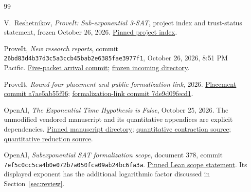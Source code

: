 \clearpage
{}
{}

\begin{thebibliography}{99}

V.~Reshetnikov, \emph{ProveIt: Sub-exponential 3-SAT}, project index and trust-status statement, frozen October 26, 2026. \href{https://github.com/VladimirReshetnikov/ProveIt/blob/8e76d515063c4b9fbd8743a846b457e3a01bc039/Computability/SubexponentialSAT/README.md}{Pinned project index}.

ProveIt, \emph{New research reports}, commit \texttt{26bd83d4b37d3c5a3ccb45bab2e6385fae3977f1}, October 26, 2026, 8:51 PM Pacific. \href{https://github.com/VladimirReshetnikov/ProveIt/commit/26bd83d4b37d3c5a3ccb45bab2e6385fae3977f1}{Five-packet arrival commit}; \href{https://github.com/VladimirReshetnikov/ProveIt/tree/8e76d515063c4b9fbd8743a846b457e3a01bc039/docs/incoming}{frozen incoming directory}.

ProveIt, \emph{Round-four placement and public formalization link}, 2026. \href{https://github.com/VladimirReshetnikov/ProveIt/commit/a7ae5ab55f9627f5af7bf77443b3c34ef8ef1be4}{Placement commit a7ae5ab55f96}; \href{https://github.com/VladimirReshetnikov/ProveIt/commit/7de9d09fecd17de776d712835ecb2011205c531d}{formalization-link commit 7de9d09fecd1}.

OpenAI, \emph{The Exponential Time Hypothesis is False}, October 25, 2026. The unmodified vendored manuscript and its quantitative appendices are explicit dependencies. \href{https://github.com/VladimirReshetnikov/ProveIt/tree/8e76d515063c4b9fbd8743a846b457e3a01bc039/lib/openai-math/preprints/The-Exponential-Time-Hypothesis-is-False-October-25-2026}{Pinned manuscript directory}; \href{https://github.com/VladimirReshetnikov/ProveIt/blob/8e76d515063c4b9fbd8743a846b457e3a01bc039/lib/openai-math/preprints/The-Exponential-Time-Hypothesis-is-False-October-25-2026/build/quantitative-contraction.tex}{quantitative contraction source}; \href{https://github.com/VladimirReshetnikov/ProveIt/blob/8e76d515063c4b9fbd8743a846b457e3a01bc039/lib/openai-math/preprints/The-Exponential-Time-Hypothesis-is-False-October-25-2026/build/quantitative-reduction.tex}{quantitative reduction source}.

OpenAI, \emph{Subexponential SAT formalization scope}, document 378, commit \texttt{7ef5c0cc5ca4b0e072b7a050fca09ab24bc6fa3a}. \href{https://github.com/openai/math/blob/7ef5c0cc5ca4b0e072b7a050fca09ab24bc6fa3a/lean/docs/378.md}{Pinned Lean scope statement}. Its displayed exponent has the additional logarithmic factor discussed in Section~\ref{sec:review}.


\end{thebibliography}
